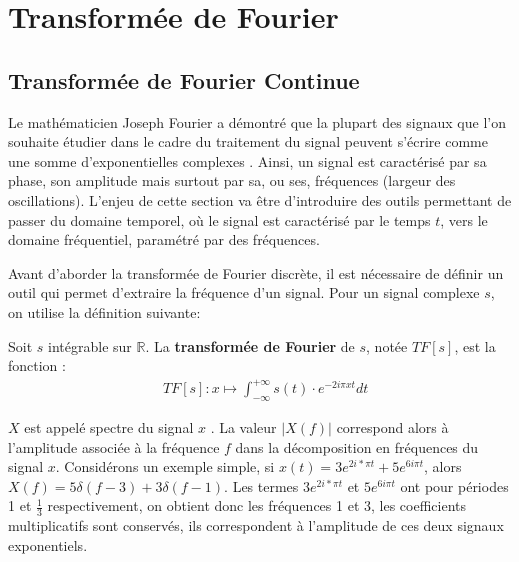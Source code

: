 \section{Transformée de Fourier}

\subsection{Transformée de Fourier Continue}

Le mathématicien Joseph Fourier a démontré que la plupart des signaux que l'on souhaite étudier dans le cadre du traitement du signal peuvent s'écrire comme une somme d'exponentielles complexes \cite{wiki-fft} . Ainsi, un signal est caractérisé par sa phase, son amplitude mais surtout par sa, ou ses, fréquences (largeur des oscillations). L'enjeu de cette section va être d'introduire des outils permettant de passer du domaine temporel, où le signal est caractérisé par le temps $t$, vers le domaine fréquentiel, paramétré par des fréquences.

Avant d'aborder la transformée de Fourier discrète, il est nécessaire de définir un outil qui permet d'extraire la fréquence d'un signal. Pour un signal complexe $s$, on utilise la définition suivante:


Soit $s$ intégrable sur $\mathbb{R}$. La \textbf{transformée de Fourier} de $s$, notée $TF[s]$, est la fonction :
\begin{align*}
    &TF[s] : x \mapsto \int_{-\infty}^{+\infty} s(t) \cdot e^{-2 i \pi x t}dt
\end{align*}


$X$ est appelé spectre du signal $x$ \cite{wiki-tf}. La valeur $|X(f)|$ correspond alors à l'amplitude associée à la fréquence $f$ dans la décomposition en fréquences du signal $x$. Considérons un exemple simple, si $x(t) = 3 e^{2 i * \pi t} + 5 e^{6 i \pi t}$, alors $X(f) = 5 \delta(f - 3) + 3 \delta(f - 1)$. Les termes $3 e^{2 i * \pi t}$ et $5 e^{6 i \pi t}$ ont pour périodes 1 et $\tfrac{1}{3}$ respectivement, on obtient donc les fréquences 1 et 3, les coefficients multiplicatifs sont conservés, ils correspondent à l'amplitude de ces deux signaux exponentiels.


